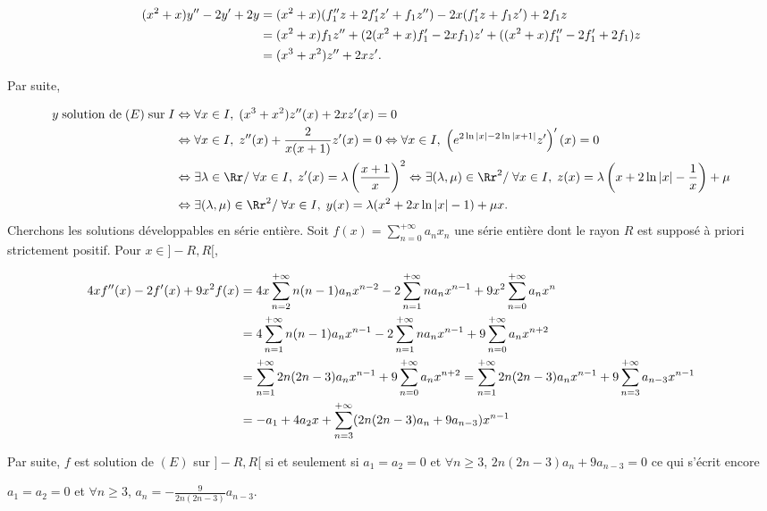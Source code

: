 {\begin{enumerate}
{\begin{align*}\ensuremath
(x^2+x)y''-2y'+2y&=(x^2+x)(f_1''z+2f_1'z'+f_1z'')-2x(f_1'z+f_1z')+2f_1z\\
 &=(x^2+x)f_1z''+(2(x^2+x)f_1'-2xf_1)z'+((x^2+x)f_1''-2f_1'+2f_1)z\\
 &=(x^3+x^2)z''+2xz'.
\end{align*}

Par suite,

\begin{align*}\ensuremath
y\;\text{solution de}\;(E)\;\text{sur}\;I&\Leftrightarrow\forall x\in I,\;(x^3+x^2)z''(x)+2xz'(x)=0\\
 &\Leftrightarrow\forall x\in I,\;z''(x)+ \frac{2}{x(x+1)}z'(x)=0\Leftrightarrow\forall x\in I,\;\left(e^{2\ln|x|-2\ln|x+1|}z'\right)'(x)=0\\
  &\Leftrightarrow\exists\lambda\in\Rr/\;\forall x\in I,\;z'(x)=\lambda\left( \frac{x+1}{x}\right)^2\Leftrightarrow\exists(\lambda,\mu)\in\Rr^2/\;\forall x\in I,\;z(x)=\lambda\left(x+2\ln|x|- \frac{1}{x}\right)+\mu\\
  &\Leftrightarrow\exists(\lambda,\mu)\in\Rr^2/\;\forall x\in I,\;y(x)=\lambda(x^2+2x\ln|x|-1)+\mu x.
\end{align*}
Cherchons les solutions développables en série entière. Soit $f(x)=\sum_{n=0}^{+\infty}a_nx_n$ une série entière dont le rayon $R$ est supposé à priori strictement positif. Pour $x\in]-R,R[$,

\begin{align*}\ensuremath
4xf''(x)-2f'(x)+9x^2f(x)&=4x\sum_{n=2}^{+\infty}n(n-1)a_nx^{n-2}-2\sum_{n=1}^{+\infty}na_nx^{n-1}+9x^2\sum_{n=0}^{+\infty}a_nx^n\\
 &=4\sum_{n=1}^{+\infty}n(n-1)a_nx^{n-1}-2\sum_{n=1}^{+\infty}na_nx^{n-1}+9\sum_{n=0}^{+\infty}a_nx^{n+2}\\
  &=\sum_{n=1}^{+\infty}2n(2n-3)a_nx^{n-1}+9\sum_{n=0}^{+\infty}a_nx^{n+2}=\sum_{n=1}^{+\infty}2n(2n-3)a_nx^{n-1}+9\sum_{n=3}^{+\infty}a_{n-3}x^{n-1}\\
  &=-a_1+4a_2x+\sum_{n=3}^{+\infty}(2n(2n-3)a_n+9a_{n-3})x^{n-1}
\end{align*}

Par suite, $f$ est solution de $(E)$ sur $]-R,R[$ si et seulement si $a_1=a_2=0$ et $\forall n\geqslant3$, $2n(2n-3)a_n+9a_{n-3}=0$ ce qui s'écrit encore 

\begin{center}
$a_1=a_2=0$ et $\forall n\geqslant3$, $a_n=- \frac{9}{2n(2n-3)}a_{n-3}$.
\end{center}

}
\end{enumerate}}
